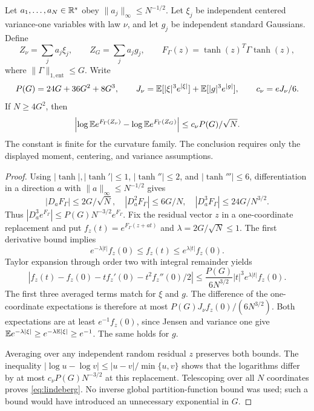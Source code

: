 \begin{lemma}\label{lem:lindeberg}
Let $a_1,\ldots,a_N\in\mathbb R^s$ obey $\|a_j\|_\infty\leq N^{-1/2}$.
Let $\xi_j$ be independent centered variance-one variables with law $\nu$,
and let $g_j$ be independent standard Gaussians. Define
\[
 Z_\nu=\sum_j a_j\xi_j,\qquad Z_G=\sum_j a_jg_j,\qquad
 F_\Gamma(z)=\tanh(z)^T\Gamma\tanh(z),
\]
where $\|\Gamma\|_{1,\mathrm{ent}}\leq G$. Write
\[
 P(G)=24G+36G^2+8G^3,\qquad
 J_\nu=\mathbb E[|\xi|^3e^{|\xi|}]+\mathbb E[|g|^3e^{|g|}],\qquad
 c_\nu=eJ_\nu/6.
\]
If $N\geq4G^2$, then
\begin{equation}\label{eq:lindeberg}
 \left|\log\mathbb E e^{F_\Gamma(Z_\nu)}-
             \log\mathbb E e^{F_\Gamma(Z_G)}\right|
 \leq c_\nu P(G)/\sqrt N.
\end{equation}
The constant is finite for the curvature family. The conclusion requires
only the displayed moment, centering, and variance assumptions.
\end{lemma}
\begin{proof}
Using $|\tanh|,|\tanh'|\leq1$, $|\tanh''|\leq2$, and
$|\tanh'''|\leq6$, differentiation in a direction $a$ with
$\|a\|_\infty\leq N^{-1/2}$ gives
\[
 |D_aF_\Gamma|\leq2G/\sqrt N,\quad
 |D_a^2F_\Gamma|\leq6G/N,\quad
 |D_a^3F_\Gamma|\leq24G/N^{3/2}.
\]
Thus $|D_a^3e^{F_\Gamma}|\leq P(G)N^{-3/2}e^{F_\Gamma}$.
Fix the residual vector $z$ in a one-coordinate replacement and put
$f_z(t)=e^{F_\Gamma(z+at)}$ and $\lambda=2G/\sqrt N\leq1$.
The first derivative bound implies
\[
 e^{-\lambda|t|}f_z(0)\leq f_z(t)\leq e^{\lambda|t|}f_z(0).
\]
Taylor expansion through order two with integral remainder yields
\[
 |f_z(t)-f_z(0)-tf_z'(0)-t^2f_z''(0)/2|
 \leq\frac{P(G)}{6N^{3/2}}|t|^3e^{\lambda|t|}f_z(0).
\]
The first three averaged terms match for $\xi$ and $g$. The difference
of the one-coordinate expectations is therefore at most
$P(G)J_\nu f_z(0)/(6N^{3/2})$. Both expectations are at least
$e^{-1}f_z(0)$, since Jensen and variance one give
$\mathbb E e^{-\lambda|\xi|}\geq e^{-\lambda\mathbb E|\xi|}\geq e^{-1}$.
The same holds for $g$.

Averaging over any independent random residual $z$ preserves both bounds.
The inequality $|\log u-\log v|\leq|u-v|/\min\{u,v\}$ shows that
the logarithms differ by at most $c_\nu P(G)N^{-3/2}$ at this
replacement. Telescoping over all $N$ coordinates proves
\eqref{eq:lindeberg}. No inverse global partition-function bound was
used; such a bound would have introduced an unnecessary exponential in
$G$.
\end{proof}

